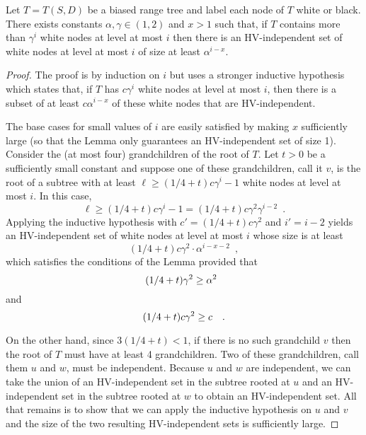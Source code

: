 \documentclass[lotsofwhite,charterfonts]{patmorin}
\begin{document}
\begin{lem}
Let $T=T(S,D)$ be a biased range tree and label each node of $T$ white
or black.  There exists constants $\alpha,\gamma\in(1,2)$ and $x>1$ such that,
if $T$ contains more than $\gamma^i$ white nodes at level at most $i$
then there is an HV-independent set of white nodes at level at most $i$
of size at least $\alpha^{i-x}$.
\end{lem}

\begin{proof}
The proof is by induction on $i$ but uses a stronger inductive
hypothesis which states that, if $T$ has $c\gamma^i$ white nodes
at level at most $i$, then there is a subset of at least
$c\alpha^{i-x}$ of these white nodes that are HV-independent.

The base cases for small values of $i$ are easily satisfied by making $x$
sufficiently large (so that the Lemma only guarantees an
HV-independent set of size 1).  Consider the (at most four)
grandchildren of the root of $T$.  Let $t>0$ be a sufficiently small
constant and suppose one of these grandchildren,
call it $v$, is the root of a subtree with at least $\ell \ge
(1/4+t)c\gamma^i-1$ white nodes at level at most $i$.  In this case,
\[
    \ell \ge (1/4+t) c\gamma^i-1 = (1/4+t)c\gamma^2
		\gamma^{i-2} \enspace .
\]
Applying the inductive hypothesis with $c'=(1/4+t)c\gamma^2$ and $i'=i-2$
yields an HV-independent set of white nodes at level at most $i$ whose 
size is at least
\[
     (1/4+t)c\gamma^2\cdot\alpha^{i-x-2} \enspace ,
\] 
which satisfies the conditions of the Lemma provided that
\begin{equation}
	(1/4+t)\gamma^2 \ge \alpha^2 \enspace \eqlabel{condition}
\end{equation}
and 
\begin{equation}
	(1/4+t)c\gamma^2 \ge c \enspace \eqlabel{condition} \enspace .
\end{equation}


On the other hand, since $3(1/4+t) < 1$, if there is no such
grandchild $v$ then the root of $T$ must have at least 4
grandchildren.  Two of these grandchildren, call them $u$ and $w$,
must be independent.
Because $u$ and $w$ are independent, we can take the union of an
HV-independent set in the subtree rooted at $u$ and an HV-independent
set in the subtree rooted at $w$ to obtain an HV-independent set.  All
that remains is to show that we can apply the inductive hypothesis on
$u$ and $v$ and the size of the two resulting HV-independent sets is
sufficiently large.


\end{proof}
\end{document}
